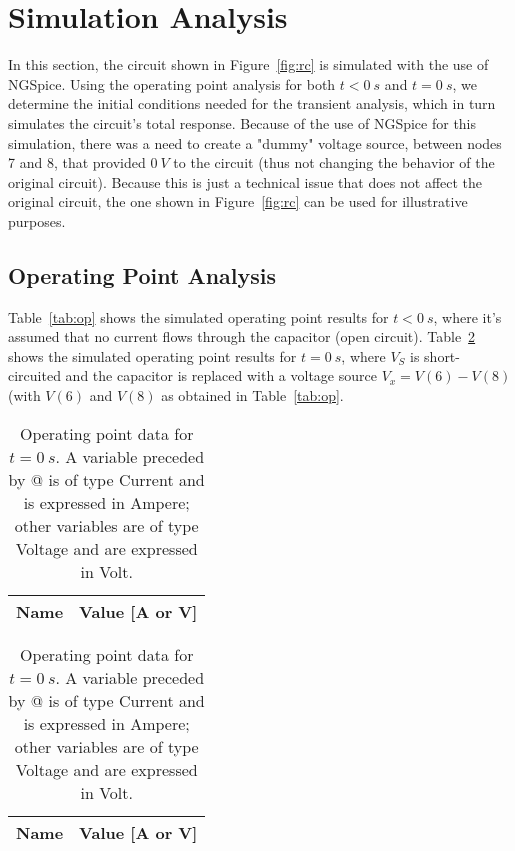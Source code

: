 \section{Simulation Analysis}
\label{sec:simulation}

In this section, the circuit shown in Figure~\ref{fig:rc} is simulated with the use of NGSpice. Using the operating point analysis for both $t<0~s$ and $t=0~s$, we determine the initial conditions needed for the transient analysis, which in turn simulates the circuit's total response.
Because of the use of NGSpice for this simulation, there was a need to create a "dummy" voltage source, between nodes 7 and 8, that provided $0~V$ to the circuit (thus not changing the behavior of the original circuit). Because this is just a technical issue that does not affect the original circuit, the one shown in Figure~\ref{fig:rc} can be used for illustrative purposes.


\subsection{Operating Point Analysis}

Table~\ref{tab:op} shows the simulated operating point results for $t<0~s$, where it's assumed that no current flows through the capacitor (open circuit).
Table~\ref{tab:op2} shows the simulated operating point results for $t=0~s$, where $V_S$ is short-circuited and the capacitor is replaced with a voltage source $V_x = V(6) - V(8)$ (with $V(6)$ and $V(8)$ as obtained in Table~\ref{tab:op}.


\begin{table}[h]
	\parbox{.45\linewidth}{
  \centering
  \begin{tabular}{|l|r|}
    \hline    
    {\bf Name} & {\bf Value [A or V]} \\ \hline
    
  \end{tabular}
  \caption{Operating point data for $t<0~s$. A variable preceded by @ is of type Current and is expressed in Ampere; other variables are of type Voltage and are expressed in Volt.}
  \label{tab:op}
}
\hfill
	\parbox{.45\linewidth}{
  \centering
  \begin{tabular}{|l|r|}
    \hline    
    {\bf Name} & {\bf Value [A or V]} \\ \hline
    
  \end{tabular}
  \caption{Operating point data for $t=0~s$. A variable preceded by @ is of type Current and is expressed in Ampere; other variables are of type Voltage and are expressed in Volt.}
  \label{tab:op2}
}	
\end{table}
            

